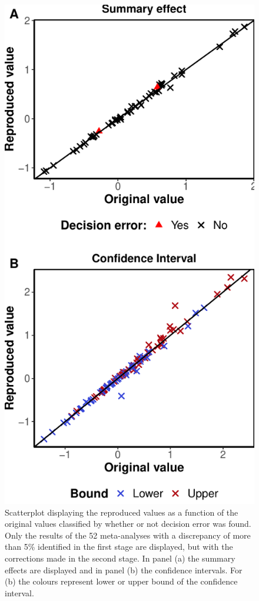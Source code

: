\documentclass[
  ,man,floatsintext]{apa6}
\begin{document}
\begin{figure}
\centering
\includegraphics{submission_files/figure-latex/unnamed-chunk-4-1.pdf}
\caption{\label{fig:unnamed-chunk-4}Scatterplot displaying the reproduced values as a function of the original values classified by whether or not decision error was found. Only the results of the 52 meta-analyses with a discrepancy of more than 5\% identified in the first stage are displayed, but with the corrections made in the second stage. In panel (a) the summary effects are displayed and in panel (b) the confidence intervals. For (b) the colours represent lower or upper bound of the confidence interval.}
\end{figure}
\end{document}
